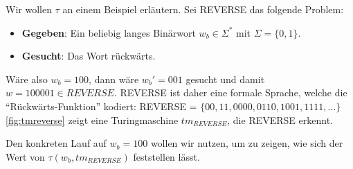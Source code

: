 Wir wollen $\tau$ an einem Beispiel erläutern.
Sei REVERSE das folgende Problem:
\begin{itemize}
    \item \textbf{Gegeben}: Ein beliebig langes Binärwort $w_b \in \Sigma^*$ mit $\Sigma = \{0,1\}$.
    \item \textbf{Gesucht}: Das Wort rückwärts.
\end{itemize}

Wäre also $w_b = 100$, dann wäre $w_b' = 001$ gesucht und damit $w = 100001 \in REVERSE$.
REVERSE ist daher eine formale Sprache,
welche die ``Rückwärts-Funktion'' kodiert:
REVERSE = $\{00, 11, 0000, 0110, 1001, 1111, \ldots\}$
\autoref{fig:tmreverse} zeigt eine Turingmaschine $tm_{REVERSE}$, die REVERSE erkennt.

Den konkreten Lauf auf $w_b = 100$ wollen wir nutzen,
um zu zeigen, wie sich der Wert von $\tau(w_b, tm_{REVERSE})$ feststellen lässt.

